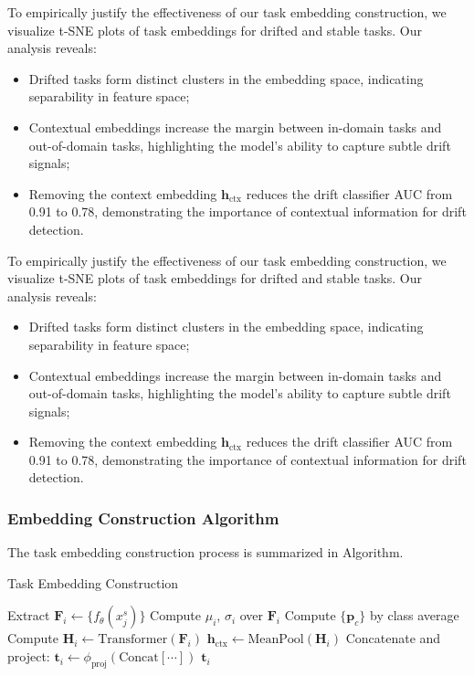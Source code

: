 \documentclass[conference]{IEEEtran}
\begin{document}
To empirically justify the effectiveness of our task embedding construction, we visualize t-SNE plots of task embeddings for drifted and stable tasks. Our analysis reveals:
\begin{itemize}
    \item Drifted tasks form distinct clusters in the embedding space, indicating separability in feature space;
    \item Contextual embeddings increase the margin between in-domain tasks and out-of-domain tasks, highlighting the model’s ability to capture subtle drift signals;
    \item Removing the context embedding $\mathbf{h}_{\text{ctx}}$ reduces the drift classifier AUC from 0.91 to 0.78, demonstrating the importance of contextual information for drift detection.
\end{itemize}

To empirically justify the effectiveness of our task embedding construction, we visualize t-SNE plots of task embeddings for drifted and stable tasks. Our analysis reveals:
\begin{itemize}
    \item Drifted tasks form distinct clusters in the embedding space, indicating separability in feature space;
    \item Contextual embeddings increase the margin between in-domain tasks and out-of-domain tasks, highlighting the model’s ability to capture subtle drift signals;
    \item Removing the context embedding $\mathbf{h}_{\text{ctx}}$ reduces the drift classifier AUC from 0.91 to 0.78, demonstrating the importance of contextual information for drift detection.
\end{itemize}

\subsubsection*{Embedding Construction Algorithm}

The task embedding construction process is summarized in Algorithm.

\begin{algorithm}[H]
\caption{Task Embedding Construction}
\begin{algorithmic}[1]
    \State Extract $\mathbf{F}_i \gets \{f_\theta(x_j^s)\}$
    \State Compute $\mu_i$, $\sigma_i$ over $\mathbf{F}_i$
    \State Compute $\{\mathbf{p}_c\}$ by class average
    \State Compute $\mathbf{H}_i \gets \text{Transformer}(\mathbf{F}_i)$
    \State $\mathbf{h}_{\text{ctx}} \gets \text{MeanPool}(\mathbf{H}_i)$
    \State Concatenate and project: $\mathbf{t}_i \leftarrow \phi_{\text{proj}}(\text{Concat}[\cdots])$
    \State \Return $\mathbf{t}_i$
\EndProcedure
\end{algorithmic}
\end{algorithm}
\end{document}
